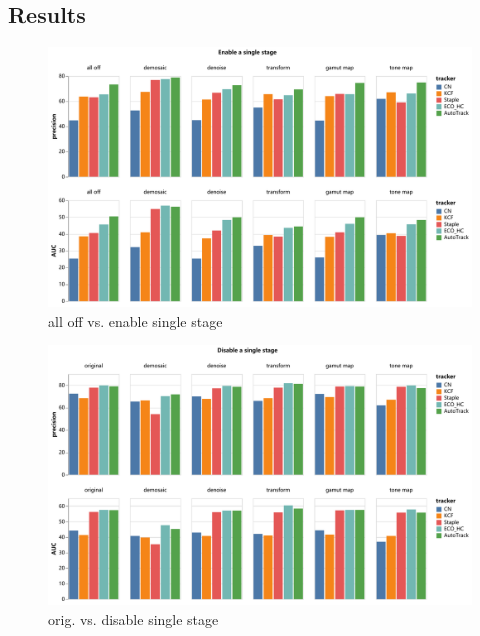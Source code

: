 \documentclass{beamer}
\begin{document}
\subsection{Results}

\begin{frame}
    \begin{figure}[htpb]
        \begin{center}
            \includegraphics[width=0.8\linewidth]{fig/en.pdf}
            \caption{all off vs. enable single stage}
        \end{center}
    \end{figure}
\end{frame}

\begin{frame}
    \begin{figure}[htpb]
        \begin{center}
            \includegraphics[width=0.8\linewidth]{fig/dis.pdf}
            \caption{orig. vs. disable single stage}
        \end{center}
    \end{figure}
\end{frame}
\end{document}
